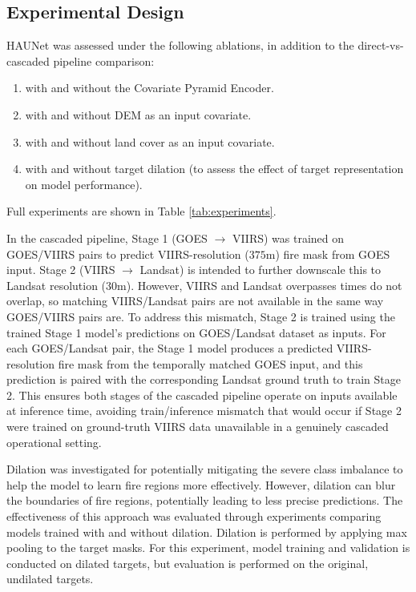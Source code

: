 \documentclass[a4paper, 11pt]{article} %
\begin{document}
\subsection{Experimental Design}
HAUNet was assessed under the following ablations, in addition to the direct-vs-cascaded pipeline comparison:
\begin{enumerate}
    \item with and without the Covariate Pyramid Encoder.
    \item with and without DEM as an input covariate.
    \item with and without land cover as an input covariate.
    \item with and without target dilation (to assess the effect of target representation on model performance).
\end{enumerate}

Full experiments are shown in Table \ref{tab:experiments}.

In the cascaded pipeline, Stage 1 (GOES $\to$ VIIRS) was trained on GOES/VIIRS pairs to predict VIIRS-resolution ($375$m) fire mask from GOES input. Stage 2 (VIIRS $\to$ Landsat) is intended to further downscale this to Landsat resolution ($30$m). However, VIIRS and Landsat overpasses times do not overlap, so matching VIIRS/Landsat pairs are not available in the same way GOES/VIIRS pairs are. To address this mismatch, Stage 2 is trained using the trained Stage 1 model's predictions on GOES/Landsat dataset as inputs. For each GOES/Landsat pair, the Stage 1 model produces a predicted VIIRS-resolution fire mask from the temporally matched GOES input, and this prediction is paired with the corresponding Landsat ground truth to train Stage 2. This ensures both stages of the cascaded pipeline operate on inputs available at inference time, avoiding train/inference mismatch that would occur if Stage 2 were trained on ground-truth VIIRS data unavailable in a genuinely cascaded operational setting.

Dilation was investigated for potentially mitigating the severe class imbalance to help the model to learn fire regions more effectively. However, dilation can blur the boundaries of fire regions, potentially leading to less precise predictions. The effectiveness of this approach was evaluated through experiments comparing models trained with and without dilation. Dilation is performed by applying max pooling to the target masks. For this experiment, model training and validation is conducted on dilated targets, but evaluation is performed on the original, undilated targets.
\end{document}
